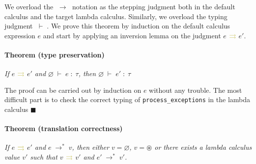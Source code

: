 \documentclass[11pt,a4paper]{article}
\newcommand{\synvar}[1]{\ensuremath{#1}}
\newcommand{\synemptydefault}{\synvar{\varnothing}}
\newcommand{\synerror}{\synvar{\circledast}}
\newcommand{\typctx}[1]{\textcolor{orange!90!black}{\ensuremath{#1}}}
\newcommand{\typempty}{\typctx{\varnothing}}
\newcommand{\typvdash}{\typctx{\;\vdash\;}}
\newcommand{\typcolon}{\typctx{\;:\;}}
\newcommand{\exctx}[1]{\textcolor{blue!80!black}{\ensuremath{#1}}}
\newcommand{\exeval}{\exctx{\;\longrightarrow\;}}
\newcommand{\exevalstar}{\exctx{\;\longrightarrow^*\;}}
\newcommand{\compctx}[1]{\textcolor{yellow!70!black}{\ensuremath{#1}}}
\newcommand{\compiles}{\ensuremath{~\compctx{\rightrightarrows}~}}
\begin{document}
We overload the \exeval{} notation as 
the stepping judgment both in the default calculus and the target lambda 
calculus. Similarly, we overload the typing judgment \typvdash. 
We prove this theorem by induction on the default calculus expression \synvar{e} and start 
by applying an inversion lemma on the judgment \synvar{e}\compiles\synvar{e'}. 


\paragraph{Theorem (type preservation)} \textit{If \synvar{e}\compiles\synvar{e'} 
and \typempty\typvdash\synvar{e}\typcolon\synvar{\tau}, then 
\typempty\typvdash\synvar{e'}\typcolon\synvar{\tau}}

The proof can be carried out by induction on \synvar{e} without any trouble.
The most difficult part is to check the correct typing of \texttt{process\_exceptions}
in the lambda calculus $\blacksquare$

\paragraph{Theorem (translation correctness)} \textit{If \synvar{e}\compiles\synvar{e'} 
and \synvar{e}\exevalstar\synvar{v}, then 
either $\synvar{v}=\synemptydefault$, $\synvar{v}=\synerror$  or 
there exists a lambda calculus value \synvar{v'} such that 
\synvar{v}\compiles\synvar{v'} and \synvar{e'}\exevalstar\synvar{v'}.}
\end{document}
